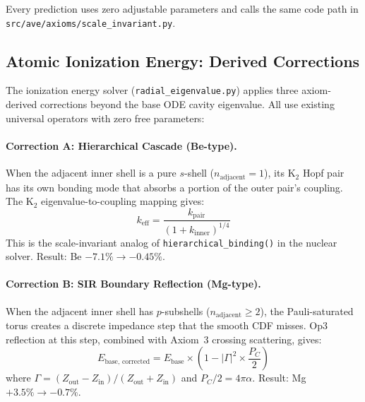 Every prediction uses zero adjustable parameters and calls the same
code path in \texttt{src/ave/axioms/scale\_invariant.py}.

\subsection{Atomic Ionization Energy: Derived Corrections}
\label{sec:ie_derived_corrections}

The ionization energy solver (\texttt{radial\_eigenvalue.py}) applies three
axiom-derived corrections beyond the base ODE cavity eigenvalue.  All
use existing universal operators with zero free parameters:

\paragraph{Correction A: Hierarchical Cascade (Be-type).}
When the adjacent inner shell is a pure $s$-shell ($n_\text{adjacent} = 1$),
its K$_2$ Hopf pair has its own bonding mode that absorbs a portion of the
outer pair's coupling.  The K$_2$ eigenvalue-to-coupling mapping gives:
\begin{equation}
    k_\text{eff} = \frac{k_\text{pair}}{(1 + k_\text{inner})^{1/4}}
    \tag{CA}
    \label{eq:correction_a}
\end{equation}
This is the scale-invariant analog of \texttt{hierarchical\_binding()} in
the nuclear solver.  Result: Be $-7.1\% \to -0.45\%$.

\paragraph{Correction B: SIR Boundary Reflection (Mg-type).}
When the adjacent inner shell has $p$-subshells ($n_\text{adjacent} \geq 2$),
the Pauli-saturated torus creates a discrete impedance step that the smooth
CDF misses.  Op3 reflection at this step, combined with Axiom~3 crossing
scattering, gives:
\begin{equation}
    E_\text{base, corrected} = E_\text{base} \times \left(1 - |\Gamma|^2 \times \frac{P_C}{2}\right)
    \tag{CB}
    \label{eq:correction_b}
\end{equation}
where $\Gamma = (Z_\text{out} - Z_\text{in})/(Z_\text{out} + Z_\text{in})$
and $P_C/2 = 4\pi\alpha$.  Result: Mg $+3.5\% \to -0.7\%$.

